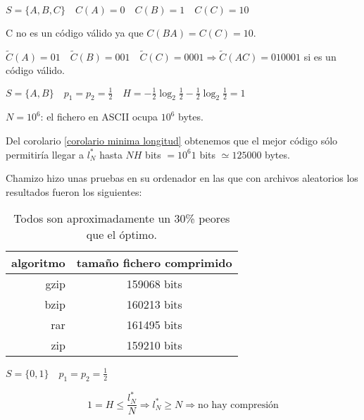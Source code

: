	\begin{example}

		$S = \{A,B,C\} \quad C(A) = 0 \quad C(B) = 1 \quad C(C) = 10$

		C no es un código válido ya que $C(BA) = C(C) = 10$.

		$\widetilde{C}(A) = 01 \quad \widetilde{C}(B) = 001 \quad \widetilde{C}(C) = 0001 \Rightarrow \widetilde{C}(AC) = 010001 $ si es un código válido.

	\end{example}


	\begin{example}


		$S = \{A,B\} \quad p_1 = p_2 = \frac{1}{2} \quad H = -\frac{1}{2} \log_2 \frac{1}{2} - \frac{1}{2} \log_2 \frac{1}{2} = 1$

		$N = 10^6$: el fichero en ASCII ocupa $10^6$ bytes.

		Del corolario \ref{corolario minima longitud} obtenemos que el mejor código sólo permitiría llegar a $l^*_N$ hasta $NH$ bits $= 10^6 1$ bits $\simeq 125000$ bytes.

		Chamizo hizo unas pruebas en su ordenador en las que con archivos aleatorios los resultados fueron los siguientes:


		\begin{table}[h]
			\centering
			\begin{tabular}{r|c}
			algoritmo & tamaño fichero comprimido \\ \hline
			gzip & 159068 bits \\
			bzip & 160213 bits \\
			rar & 161495 bits \\
			zip & 159210 bits
			\end{tabular}
			\caption{Todos son aproximadamente un 30\% peores que el óptimo.}
		\end{table}
		


	\end{example}


	\begin{example}

		$S = \{0,1\} \quad p_1 = p_2 = \frac{1}{2}$

		$$ 1 = H \leq \frac{l^*_N}{N} \Rightarrow l^*_N \geq N \Rightarrow \text{no hay compresión} $$

	\end{example}

